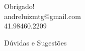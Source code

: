 \documentclass[../quali_slides.tex]{subfiles}
\begin{document}

{
	\begin{frame}[standout]
		Obrigado! \\
		andreluizmtg@gmail.com\\
		41.98460.2209
	\end{frame}
}


{
	\begin{frame}[standout]
		Dúvidas e Sugestões
	\end{frame}
	}
\end{document}
